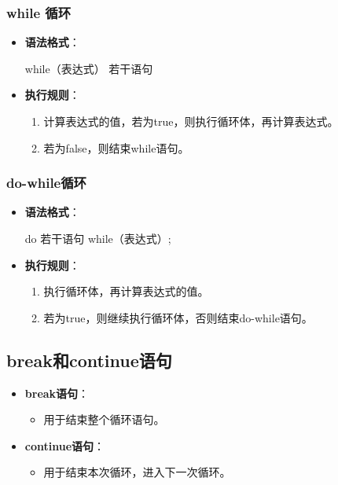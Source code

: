 \documentclass[a4paper, 10pt]{ctexart}
\begin{document}
\subsubsection{while 循环}
\begin{itemize}
  \item \textbf{语法格式}：
  \begin{codeblock}
while（表达式） {
    若干语句
}
  \end{codeblock}
  \item \textbf{执行规则}：
  \begin{enumerate}
    \item 计算表达式的值，若为true，则执行循环体，再计算表达式。
    \item 若为false，则结束while语句。
  \end{enumerate}
\end{itemize}

\subsubsection{do-while循环}
\begin{itemize}
  \item \textbf{语法格式}：
  \begin{codeblock}
do {
    若干语句
} while（表达式）;
  \end{codeblock}
  \item \textbf{执行规则}：
  \begin{enumerate}
    \item 执行循环体，再计算表达式的值。
    \item 若为true，则继续执行循环体，否则结束do-while语句。
  \end{enumerate}
\end{itemize}

\subsection{break和continue语句}
\begin{itemize}
  \item \textbf{break语句}：
  \begin{itemize}
    \item 用于结束整个循环语句。
  \end{itemize}
  \item \textbf{continue语句}：
  \begin{itemize}
    \item 用于结束本次循环，进入下一次循环。
  \end{itemize}
\end{itemize}
\end{document}
